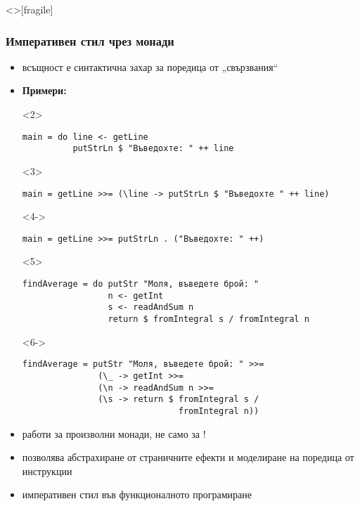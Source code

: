 \documentclass[alsotrans,beameroptions={aspectratio=169}]{beamerswitch}
\begin{document}
\begin{frame}<>[fragile]
  \frametitle{Императивен стил чрез монади}

  \small
  \begin{fixedarea}
    \begin{itemize}[<+->]
    \item {} всъщност е синтактична захар за поредица от „свързвания“
    \item \textbf{Примери:}
      \begin{onlyenv}<2>
\begin{lstlisting}
main = do line <- getLine
          putStrLn $ "Въведохте: " ++ line
\end{lstlisting}
      \end{onlyenv}
      \begin{onlyenv}<3>
\begin{lstlisting}
main = getLine >>= (\line -> putStrLn $ "Въведохте " ++ line)
\end{lstlisting}
      \end{onlyenv}
      \begin{onlyenv}<4->
\begin{lstlisting}
main = getLine >>= putStrLn . ("Въведохте: " ++)
\end{lstlisting}
      \end{onlyenv}
      \begin{onlyenv}<5>
\begin{lstlisting}
findAverage = do putStr "Моля, въведете брой: "
                 n <- getInt
                 s <- readAndSum n
                 return $ fromIntegral s / fromIntegral n
\end{lstlisting}
      \end{onlyenv}
      \begin{onlyenv}<6->
\begin{lstlisting}
findAverage = putStr "Моля, въведете брой: " >>=
               (\_ -> getInt >>=
               (\n -> readAndSum n >>=
               (\s -> return $ fromIntegral s /
                               fromIntegral n))
\end{lstlisting}
      \end{onlyenv}
    \item<7-> работи за произволни монади, не само за !
    \item<8-> позволява абстрахиране от страничните ефекти и моделиране на поредица от инструкции
    \item<9-> императивен стил във функционалното програмиране
    \end{itemize}
  \end{fixedarea}
\end{frame}
\end{document}
